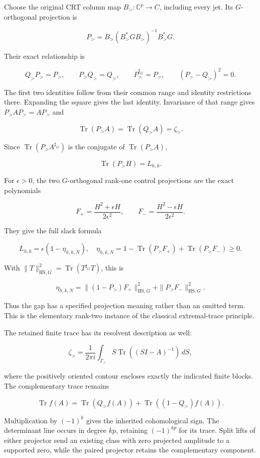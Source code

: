 Choose the original CRT column map \(B_{>}:\mathbb C^p\to C\), including
every jet. Its \(G\)-orthogonal projection is

\[
\boxed{
P_{>}=B_{>}(B_{>}^*GB_{>})^{-1}B_{>}^*G.
}
\]

Their exact relationship is

\[
Q_{>}P_{>}=P_{>},\qquad P_{>}Q_{>}=Q_{>},\qquad
P_{>}^{\sharp_G}=P_{>},\qquad(P_{>}-Q_{>})^2=0.
\]

The first two identities follow from their common range and identity
restrictions there. Expanding the square gives the last identity.
Invariance of that range gives \(P_{>}AP_{>}=AP_{>}\) and

\[
\operatorname{Tr}(P_{>}A)=\operatorname{Tr}(Q_{>}A)=\zeta_{>}.
\]

Since \(\operatorname{Tr}(P_{>}A^{\sharp_G})\) is the conjugate of
\(\operatorname{Tr}(P_{>}A)\),

\[
\boxed{\operatorname{Tr}(P_{>}H)=L_{h,k}.}
\]

For \(\epsilon>0\), the two \(G\)-orthogonal rank-one control
projections are the exact polynomials

\[
F_+=\frac{H^2+\epsilon H}{2\epsilon^2},\qquad
F_-=\frac{H^2-\epsilon H}{2\epsilon^2}.
\]

They give the full slack formula

\[
\boxed{
L_{h,k}=\epsilon(1-\eta_{h,k,N}),
\quad
\eta_{h,k,N}=1-\operatorname{Tr}(P_{>}F_+)
                  +\operatorname{Tr}(P_{>}F_-)\geq0.
}
\]

With \(\|T\|_{\mathrm{HS},G}^2=\operatorname{Tr}(T^{\sharp_G}T)\), this
is

\[
\eta_{h,k,N}
=\|(1-P_{>})F_+\|_{\mathrm{HS},G}^2
 +\|P_{>}F_-\|_{\mathrm{HS},G}^2.
\]

Thus the gap has a specified projection meaning rather than an omitted
term. This is the elementary rank-two instance of the classical
extremal-trace principle.

The retained finite trace has its resolvent description as well:

\[
\zeta_{>}
=\frac1{2\pi i}\int_{\Gamma_{>}}
S\operatorname{Tr}((SI-A)^{-1})\,dS,
\]

where the positively oriented contour encloses exactly the indicated
finite blocks. The complementary trace remains

\[
\operatorname{Tr}f(A)
=\operatorname{Tr}(Q_{>}f(A))
 +\operatorname{Tr}((1-Q_{>})f(A)).
\]

Multiplication by \((-1)^k\) gives the inherited cohomological sign. The
determinant line occurs in degree \(kp\), retaining \((-1)^{kp}\) for
its trace. Split lifts of either projector send an existing class with
zero projected amplitude to a supported zero, while the paired projector
retains the complementary component.

